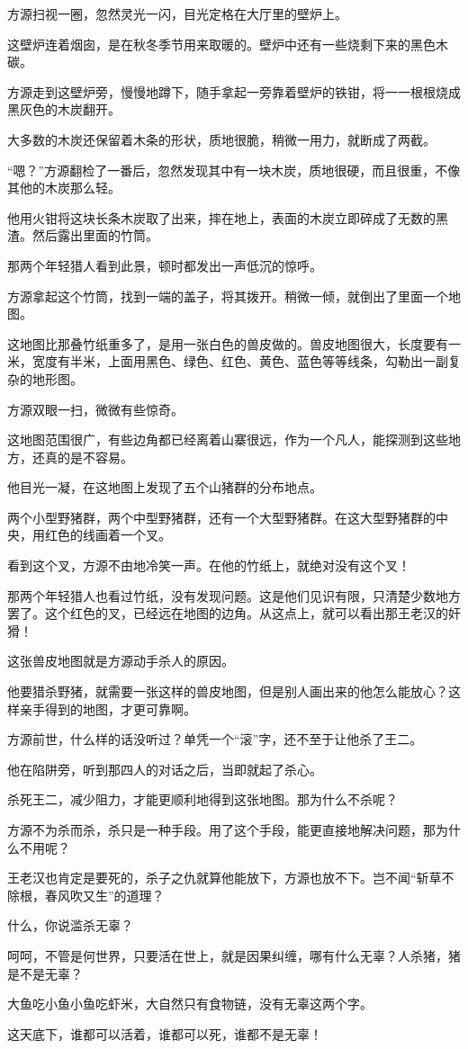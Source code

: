 \begin{this_body}
方源扫视一圈，忽然灵光一闪，目光定格在大厅里的壁炉上。

这壁炉连着烟囱，是在秋冬季节用来取暖的。壁炉中还有一些烧剩下来的黑色木碳。

方源走到这壁炉旁，慢慢地蹲下，随手拿起一旁靠着壁炉的铁钳，将一一根根烧成黑灰色的木炭翻开。

大多数的木炭还保留着木条的形状，质地很脆，稍微一用力，就断成了两截。

“嗯？”方源翻检了一番后，忽然发现其中有一块木炭，质地很硬，而且很重，不像其他的木炭那么轻。

他用火钳将这块长条木炭取了出来，摔在地上，表面的木炭立即碎成了无数的黑渣。然后露出里面的竹筒。

那两个年轻猎人看到此景，顿时都发出一声低沉的惊呼。

方源拿起这个竹筒，找到一端的盖子，将其拨开。稍微一倾，就倒出了里面一个地图。

这地图比那叠竹纸重多了，是用一张白色的兽皮做的。兽皮地图很大，长度要有一米，宽度有半米，上面用黑色、绿色、红色、黄色、蓝色等等线条，勾勒出一副复杂的地形图。

方源双眼一扫，微微有些惊奇。

这地图范围很广，有些边角都已经离着山寨很远，作为一个凡人，能探测到这些地方，还真的是不容易。

他目光一凝，在这地图上发现了五个山猪群的分布地点。

两个小型野猪群，两个中型野猪群，还有一个大型野猪群。在这大型野猪群的中央，用红色的线画着一个叉。

看到这个叉，方源不由地冷笑一声。在他的竹纸上，就绝对没有这个叉！

那两个年轻猎人也看过竹纸，没有发现问题。这是他们见识有限，只清楚少数地方罢了。这个红色的叉，已经远在地图的边角。从这点上，就可以看出那王老汉的奸猾！

这张兽皮地图就是方源动手杀人的原因。

他要猎杀野猪，就需要一张这样的兽皮地图，但是别人画出来的他怎么能放心？这样亲手得到的地图，才更可靠啊。

方源前世，什么样的话没听过？单凭一个“滚”字，还不至于让他杀了王二。

他在陷阱旁，听到那四人的对话之后，当即就起了杀心。

杀死王二，减少阻力，才能更顺利地得到这张地图。那为什么不杀呢？

方源不为杀而杀，杀只是一种手段。用了这个手段，能更直接地解决问题，那为什么不用呢？

王老汉也肯定是要死的，杀子之仇就算他能放下，方源也放不下。岂不闻“斩草不除根，春风吹又生”的道理？

什么，你说滥杀无辜？

呵呵，不管是何世界，只要活在世上，就是因果纠缠，哪有什么无辜？人杀猪，猪是不是无辜？

大鱼吃小鱼小鱼吃虾米，大自然只有食物链，没有无辜这两个字。

这天底下，谁都可以活着，谁都可以死，谁都不是无辜！

\end{this_body}

